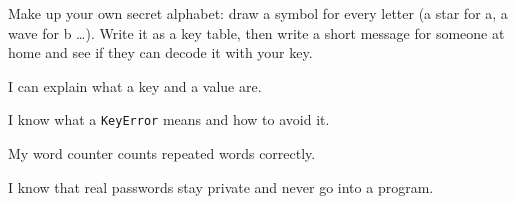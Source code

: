 \begin{creative}
Make up your own secret alphabet: draw a symbol for every letter (a star for a, a wave for b \ldots{}). Write it as a key
table, then write a short message for someone at home and see if they can decode it with your key.
\answerspace{4cm}
\end{creative}

\begin{selfcheck}
  \item I can explain what a key and a value are.
  \item I know what a \texttt{KeyError} means and how to avoid it.
  \item My word counter counts repeated words correctly.
  \item I know that real passwords stay private and never go into a program.
\end{selfcheck}
